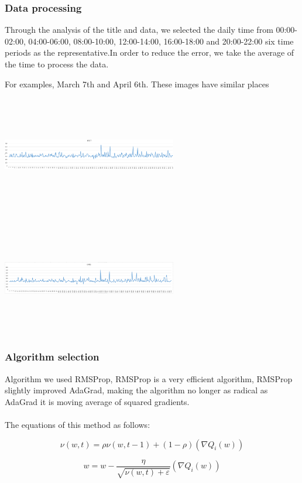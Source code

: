 \documentclass[conference,compsoc]{appendix/report}
\begin{document}
\subsubsection{Data processing}
Through the analysis of the title and data, we selected the daily time from 00:00-02:00, 04:00-06:00, 08:00-10:00, 12:00-14:00, 16:00-18:00 and 20:00-22:00 six time periods as the representative.In order to reduce the error, we take the average of the time to process the data.

For examples, March 7th and April 6th. These images have similar places

\includegraphics[width=3.00in,height=2.00in]{appendix/0307.eps}

\includegraphics[width=3.00in,height=2.00in]{appendix/0406.eps}
\subsubsection{Algorithm selection}
Algorithm we used RMSProp, RMSProp is a very efficient algorithm, RMSProp slightly improved AdaGrad, making the algorithm no longer as radical as AdaGrad it is moving average of squared gradients.
\\
\\
The equations of this method as follows:

$$ \nu\left (w, t \right ) = \rho \nu\left ( w, t - 1 \right ) + \left ( 1 - \rho \right )\left ( 
\nabla{Q}_{i}(w) \right )$$

$$ w  = w - \frac{\eta }{\sqrt{\nu (w, t) + \varepsilon }} \left ( \nabla{Q}_{i}(w) \right )$$
\end{document}
